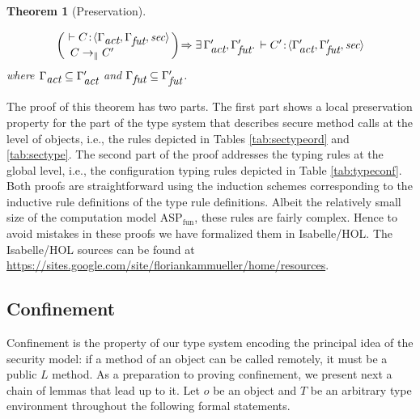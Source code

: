 \documentclass[10pt, conference, compsocconf]{IEEEtran}
\newcommand\aspfunp{ASP${}_\text{fun}$}
\newcommand{\symb}[1]{\makebox{\it #1}}
\newcommand\dist{\ensuremath{\to_\|}}
\newtheorem{theorem}{Theorem}
\begin{document}
{\begin{theorem}[Preservation]
\label{thm:subred}
\begin{small}
\[
\left( 
\begin{array}{l}
\! \vdash C\!:\!\langle \Gamma_{\symb{act}}, \Gamma_{\symb{fut}}, \symb{sec}\rangle\! \\ C\dist C'
\end{array}
\!\right)\!
\Rightarrow \exists\,
\Gamma_{\symb{act}}', \Gamma_{\symb{fut}}'.\, \vdash  C'\!:\! \langle \Gamma_{\symb{act}}', \Gamma_{\symb{fut}}', \symb{sec} \rangle
\]
where $\Gamma_{\symb{act}}\subseteq\Gamma_{\symb{act}}'$ and $\Gamma_{\symb{fut}}\subseteq\Gamma_{\symb{fut}}'$.
\end{small}
\end{theorem}

The proof of this theorem has two parts. The first part shows a local preservation property
for the part of the type system that describes secure method calls at the level of objects, i.e.,
the rules depicted in Tables \ref{tab:sectypeord} and \ref{tab:sectype}. The second part of the proof
addresses the typing rules at the global level, i.e., the configuration typing rules depicted in 
Table \ref{tab:typeconf}. Both proofs are straightforward using the induction schemes corresponding to
the inductive rule definitions of the type rule definitions. Albeit the relatively small size of the 
computation model \aspfunp, these rules are fairly complex. Hence to avoid mistakes in these proofs we have 
formalized them in Isabelle/HOL. 
The Isabelle/HOL sources can be found at \url{https://sites.google.com/site/floriankammueller/home/resources}.

\subsection{Confinement}
\label{sec:conf}
Confinement is the property of our type system encoding the principal idea of
the security model: if a method of an object can be called remotely, it must be a
public $L$ method.
As a preparation to proving confinement, we present next a chain of lemmas that lead up to it.
Let $o$ be an object and $T$ be an arbitrary type environment throughout the following formal
statements.



}
\end{document}
